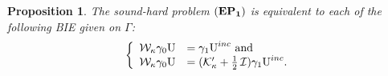 \documentclass[1pt]{article}
\newcommand{\be}{\begin{equation}}
\newcommand{\ee}{\end{equation}}
\newcommand{\mK}{\mathcal{K}}
\newcommand{\mI}{\nobreak\hspace{.16667em plus .08333em}\mathcal{I}}
\newcommand{\U}{{\text{U}}}
\newtheorem{proposition}{Proposition}
\begin{document}
\begin{proposition}
The \emph{sound-hard} problem ${\bf (EP_1)}$ is equivalent to each of the following BIE given on $\Gamma$:
\be
\left\{
\label{eq:B_EP_0}
\begin{array}{ll}
\mathcal{W}_\kappa \gamma_0 \U &= \gamma_1 \U^{inc}\text{ and }\\
\mathcal{W}_\kappa \gamma_0 \U &= (\mK'_\kappa+\frac{1}{2}\mI) \gamma_1 \U^{inc}.
\end{array}
\right.
\ee
\end{proposition}
\end{document}

